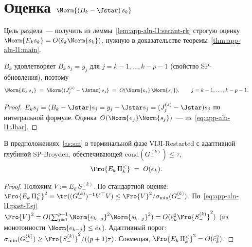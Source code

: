 \section{Оценка \texorpdfstring{$\Norm{(B_k - \Jstar)\,s_k}$}{|(B_k-J*) s_k|}}
\label{sec:app-aln-l1:dm-bound}

Цель раздела~--- получить из леммы~\ref{lem:app-aln-l1:secant-rk}
строгую оценку $\Norm{E_k s_k} = O(\bar e_k\Norm{s_k})$, нужную в
доказательстве теоремы~\ref{thm:app-aln-l1:main}.

\begin{lemma}
\label{lem:app-aln-l1:past-secant}
$B_k$ удовлетворяет $B_k\,s_j = y_j$ для $j = k-1,\ldots,k-p-1$
\textup{(}свойство SP-обновления\textup{)}, поэтому
\begin{equation}
\Norm{E_k\,s_j} \;=\; \Norm{(J_j^{(s)} - \Jstar)\,s_j}
\;=\; O(\Norm{e_j}\,\Norm{s_j}),
\qquad j = k-1,\ldots,k-p-1.
\label{eq:app-aln-l1:past-Esj}
\end{equation}
\end{lemma}

\begin{proof}
$E_k s_j = (B_k - \Jstar)s_j = y_j - \Jstar s_j = (J_j^{(s)} - \Jstar)s_j$
по интегральной формуле. Оценка~$O(\Norm{e_j}\Norm{s_j})$~---
из~\eqref{eq:app-aln-l1:Jbar}.
\end{proof}

\begin{proposition}[Норма $E_k\Pi_k^{<}$]
\label{prop:app-aln-l1:Ek-past}
В предположениях~\ref{as:sm} в терминальной фазе VIJI-Restarted
с адаптивной глубиной SP-Broyden, обеспечивающей
$\mathrm{cond}(G_-^{(k)})\le\tau$,
\begin{equation}
\Fro{E_k\,\Pi_k^{<}} \;=\; O(\bar e_k).
\label{eq:app-aln-l1:Ek-past}
\end{equation}
\end{proposition}

\begin{proof}
Положим $V := E_k\,S_-^{(k)}$. По стандартной оценке:
$\Fro{E_k\,\Pi_k^{<}}^{2} = \tr((G_-^{(k)})^{-1}V^{\top}V) \le
\Fro{V}^{2}/\sigma_{\min}(G_-^{(k)})$. По~\eqref{eq:app-aln-l1:past-Esj}
$\Fro{V}^{2} = O(\sum_{j=1}^{p+1}\Norm{e_{k-j}}^{2}\Norm{s_{k-j}}^{2}) =
O(\bar e_k^{2}\Fro{S_-^{(k)}}^{2})$ \textup{(}из монотонности
$\Norm{e_{k-j}} \le \bar e_k$\textup{)}. Адаптивный порог:
$\sigma_{\min}(G_-^{(k)}) \ge \Fro{S_-^{(k)}}^{2}/((p+1)\tau)$.
Совмещая, $\Fro{E_k\,\Pi_k^{<}}^{2} = O(\bar e_k^{2})$.
\end{proof}

